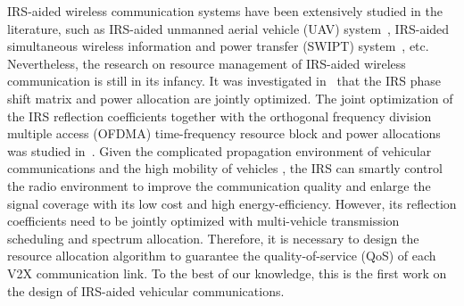 \documentclass[journal]{IEEEtran}
\begin{document}
IRS-aided wireless communication systems have been extensively studied in the literature, such as IRS-aided  unmanned aerial vehicle (UAV) system~\cite{IRS-3}, IRS-aided simultaneous wireless information and power transfer (SWIPT) system~\cite{IRS-A-12}, etc. Nevertheless, the research on resource management of IRS-aided wireless communication is still in its infancy. It was investigated in~\cite{IRS-A-9} that the IRS phase shift matrix and power allocation are jointly optimized. The joint optimization of the IRS reflection coefficients together with the orthogonal frequency division multiple access (OFDMA) time-frequency resource block and power allocations was studied in~\cite{IRS-12}. Given the complicated propagation environment of vehicular communications and the high mobility of vehicles \cite{zhang2}, the IRS can smartly control the radio environment to improve the communication quality and enlarge the signal coverage with its low cost and high energy-efficiency. However, its reflection coefficients need to be jointly optimized with multi-vehicle transmission scheduling and spectrum allocation. Therefore, it is necessary to design the resource allocation algorithm to guarantee the quality-of-service (QoS) of each V2X communication link. To the best of our knowledge, this is the first work on the design of IRS-aided vehicular communications.
\end{document}
